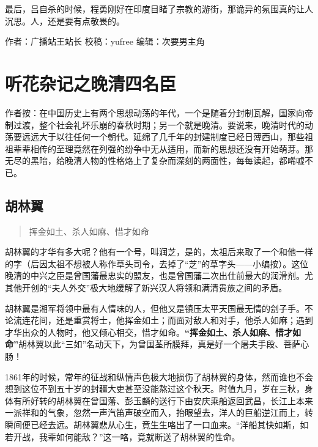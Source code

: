 \documentclass[]{book}
\begin{document}
最后，吕自杀的时候，程勇刚好在印度目睹了宗教的游街，那诡异的氛围真的让人沉思。人，还是要有点敬畏的。

作者：广播站王站长
校稿：yufree
编辑：次要男主角

\hypertarget{ux542cux82b1ux6742ux8bb0ux4e4bux665aux6e05ux56dbux540dux81e3}{%
\section{听花杂记之晚清四名臣}\label{ux542cux82b1ux6742ux8bb0ux4e4bux665aux6e05ux56dbux540dux81e3}}

作者按：在中国历史上有两个思想动荡的年代，一个是随着分封制瓦解，国家向帝制过渡，整个社会礼坏乐崩的春秋时期；另一个就是晚清。要说来，晚清时代的动荡要远远大于以往任何一个朝代。延绵了几千年的封建制度已经日薄西山，那些祖祖辈辈相传的至理竟然在列强的纷争中无从适用，而新的思想还没有开始萌芽。那无尽的黑暗，给晚清人物的性格烙上了复杂而深刻的两面性，每每读起，都唏嘘不已。

\hypertarget{ux80e1ux6797ux7ffc}{%
\subsection{胡林翼}\label{ux80e1ux6797ux7ffc}}

\begin{quote}
挥金如土、杀人如麻、惜才如命
\end{quote}

胡林翼的才华有多大呢？他有一个号，叫润芝，是的，太祖后来取了一个和他一样的字（后因太祖不想被人称作草头司令，去掉了``芝''的草字头------小编按）。这位晚清的中兴之臣是曾国藩最忠实的盟友，也是曾国藩二次出仕前最大的润滑剂。尤其他开创的``夫人外交''极大地缓解了新兴汉人将领和满清贵族之间的矛盾。

胡林翼是湘军将领中最有人情味的人，但他又是镇压太平天国最无情的刽子手。不论流连花间，还是重赏将士，他挥金如土；而面对敌人和对手，他杀人如麻；遇到才华出众的人物时，他又倾心相交，惜才如命。\textbf{``挥金如土、杀人如麻、惜才如命''}胡林翼以此``三如''名动天下，为曾国荃所膜拜，真是好一个屠夫手段、菩萨心肠！

1861年的时候，常年的征战和纵情声色极大地损伤了胡林翼的身体，然而谁也不会想到这位不到五十岁的封疆大吏甚至没能熬过这个秋天。时值九月，岁在三秋，身体有所好转的胡林翼在曾国藩、彭玉麟的送行下由安庆乘船返回武昌，长江上本来一派祥和的气象，忽然一声汽笛声破空而入，抬眼望去，洋人的巨船逆江而上，转瞬间便已经去远。胡林翼悲从心生，竟生生咯出了一口血来。``洋船其快如斯，如若开战，我辈如何能敌？''这一咯，竟就断送了胡林翼的性命。
\end{document}
